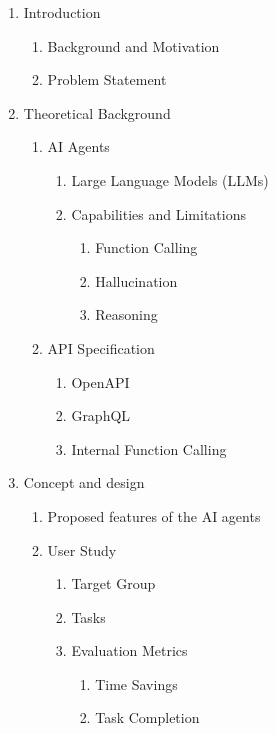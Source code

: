 \documentclass[12pt,a4paper]{article}
\begin{document}
\begin{enumerate}
	\item Introduction
	      \begin{enumerate}
		      \item Background and Motivation
		      \item Problem Statement
	      \end{enumerate}
	\item Theoretical Background
	      \begin{enumerate}
		      \item AI Agents
		            \begin{enumerate}
			            \item Large Language Models (LLMs)
			            \item Capabilities and Limitations
			                  \begin{enumerate}
				                  \item Function Calling
				                  \item Hallucination
				                  \item Reasoning
			                  \end{enumerate}
		            \end{enumerate}
		      \item API Specification
		            \begin{enumerate}
			            \item OpenAPI
			            \item GraphQL
			            \item Internal Function Calling
		            \end{enumerate}
	      \end{enumerate}
	\item Concept and design
	      \begin{enumerate}
		      \item Proposed features of the AI agents
		      \item User Study
		            \begin{enumerate}
			            \item Target Group
			            \item Tasks
			            \item Evaluation Metrics
			                  \begin{enumerate}
				                  \item Time Savings
				                  \item Task Completion

\end{enumerate}
\end{enumerate}
\end{enumerate}
\end{enumerate}
\end{document}
